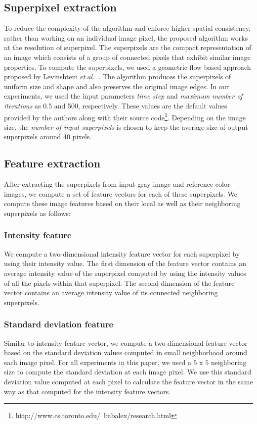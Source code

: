 \documentclass[twocolumn]{svjour3}          %
\begin{document}
\subsection{Superpixel extraction}
To reduce the complexity of the algorithm and enforce higher spatial consistency, rather than working on an individual image pixel, the proposed algorithm works at the resolution of superpixel. The superpixels are the compact representation of an image which consists of a group of connected pixels that exhibit similar image properties. To compute the superpixels, we used a geometric-flow based approach proposed by Levinshtein $et\ al.$~\cite{Alex09}. The algorithm produces the superpixels of uniform size and shape and also preserves the original image edges. In our experiments, we used the input parameters \emph{time step} and \emph{maximum number of iterations} as 0.5 and 500, respectively. These values are the default values provided by the authors along with their source code\footnote{http://www.cs.toronto.edu/~babalex/research.html}. Depending on the image size, the \emph{number of input superpixels} is chosen to keep the average size of output superpixels around 40 pixels.


\subsection{Feature extraction}
After extracting the superpixels from input gray image and reference color images, we compute a set of feature vectors for each of these superpixels. We compute these image features based on their local as well as their neighboring superpixels as follows:

\subsubsection{Intensity feature}
We compute a two-dimensional intensity feature vector for each superpixel by using their intensity value. The first dimension of the feature vector contains an average intensity value of the superpixel computed by using the intensity values of all the pixels within that superpixel. The second dimension of the feature vector contains an average intensity value of its connected neighboring superpixels.

\subsubsection{Standard deviation feature}
Similar to intensity feature vector, we compute a two-dimensional feature vector based on the standard deviation values computed in small neighborhood around each image pixel. For all experiments in this paper, we used a $5$ x $5$ neighboring size to compute the standard deviation at each image pixel. We use this standard deviation value computed at each pixel to calculate the feature vector in the same way as that computed for the intensity feature vectors. 
\end{document}
